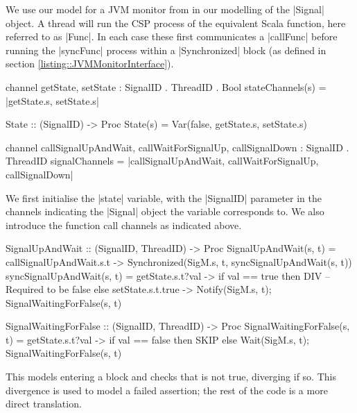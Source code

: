 We use our model for a JVM monitor from  in our modelling of the |Signal| object. 
 A thread will run the CSP process of the equivalent Scala function, here referred to as |Func|. In each case these first communicates a |callFunc| before running the |syncFunc| process within a |Synchronized| block (as defined in section \ref{listing::JVMMonitorInterface}).

 \begin{cspm}[caption={The state variable(s) and the function call channels}]
channel getState, setState : SignalID . ThreadID . Bool
stateChannels(s) = {|getState.s, setState.s|}

State :: (SignalID) -> Proc
State(s) = Var(false, getState.s, setState.s)

channel callSignalUpAndWait, callWaitForSignalUp, callSignalDown : SignalID . ThreadID
signalChannels = {|callSignalUpAndWait, callWaitForSignalUp, callSignalDown|}
 \end{cspm}

 We first initialise the |state| variable, with the |SignalID| parameter in the channels indicating the |Signal| object the variable corresponds to. We also introduce the function call channels as indicated above.

\begin{cspm}[caption={The CSP model of the {\scalastyle signalUpAndWait} function of the {\scalastyle Signal} object}]
SignalUpAndWait :: (SignalID, ThreadID) -> Proc
SignalUpAndWait(s, t) = 
  callSignalUpAndWait.s.t -> Synchronized(SigM.s, t, syncSignalUpAndWait(s, t))
syncSignalUpAndWait(s, t) = 
  getState.s.t?val -> if val == true then DIV -- Required to be false
                      else setState.s.t.true -> 
                          Notify(SigM.s, t); SignalWaitingForFalse(s, t)


SignalWaitingForFalse :: (SignalID, ThreadID) -> Proc
SignalWaitingForFalse(s, t) = 
  getState.s.t?val -> if val == false then SKIP
                      else Wait(SigM.s, t); SignalWaitingForFalse(s, t)                            
\end{cspm}

This models entering a \inlineScala {} block and checks that  is not true, diverging if so. This divergence is used to model a failed assertion; the rest of the code is a more direct translation.

